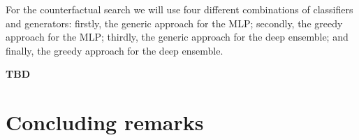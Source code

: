 \documentclass{juliacon}
\begin{document}
For the counterfactual search we will use four different combinations of
classifiers and generators: firstly, the generic approach for the MLP;
secondly, the greedy approach for the MLP; thirdly, the generic approach
for the deep ensemble; and finally, the greedy approach for the deep
ensemble.

\textbf{TBD}

\hypertarget{sec-conclude}{%
\section{Concluding remarks}\label{sec-conclude}}


\end{document}
